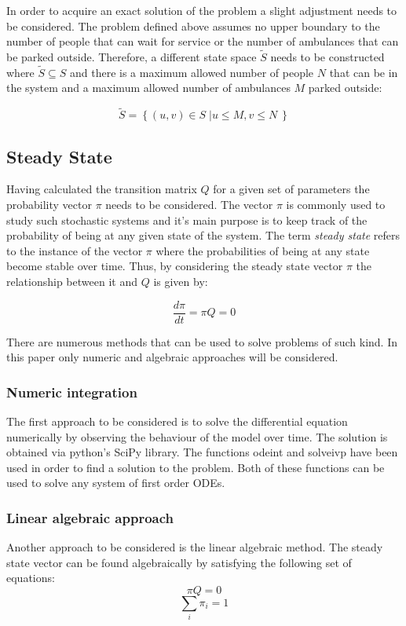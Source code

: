 In order to acquire an exact solution of the problem a slight adjustment needs to be considered. The problem defined above assumes no upper boundary to the number of people that can wait for service or the number of ambulances that can be parked outside. Therefore, a different state space \( \tilde S \) needs to be constructed where \( \tilde S \subseteq S \) and there is a maximum allowed number of people \( N \) that can be in the system and a maximum allowed number of ambulances \( M \) parked outside:

\begin{equation}
    \tilde S = \left\{ (u, v) \in S\;| u \leq M, v\leq N\ \right\}
\end{equation}


\subsection{Steady State}
Having calculated the transition matrix \( Q \) for a given set of parameters the probability vector \( \pi \) needs to be considered. The vector \( \pi \) is commonly used to study such stochastic systems and it's main purpose is to keep track of the probability of being at any given state of the system. The term \textit{steady state} refers to the instance of the vector \( \pi \) where the probabilities of being at any state become stable over time. Thus, by considering the steady state vector \( \pi \) the relationship between it and \(Q \) is given by:

\[
\frac{d\pi}{dt} = \pi Q = 0
\]

There are numerous methods that can be used to solve problems of such kind. In this paper only numeric and algebraic approaches will be considered. 

\subsubsection{Numeric integration}
The first approach to be considered is to solve the differential equation numerically by observing the behaviour of the model over time. The solution is obtained via python's SciPy library. The functions odeint and solve\textunderscore ivp have been used in order to find a solution to the problem. Both of these functions can be used to solve any system of first order ODEs.

\subsubsection{Linear algebraic approach}
Another approach to be considered is the linear algebraic method. The steady state vector can be found algebraically by satisfying the following set of equations:
\[ \pi Q = 0 \]
\[ \sum_{i} \pi_i = 1 \]


